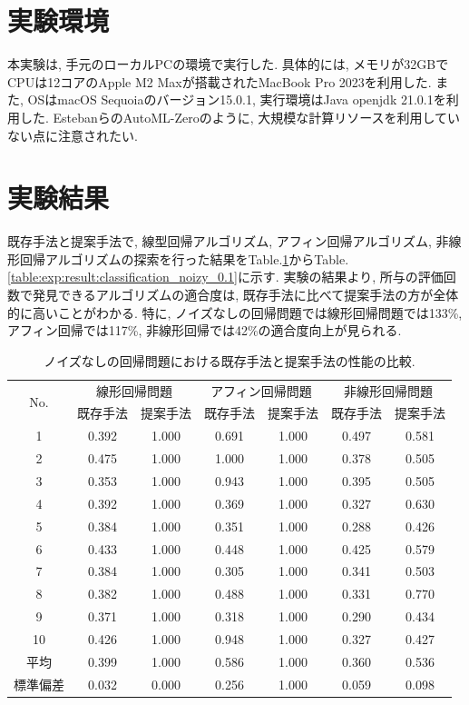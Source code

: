 \documentclass[11pt,oneside,openany,report]{jsbook}
\begin{document}
\section{実験環境}\label{sec:proposed:exp:environement}

本実験は, 手元のローカルPCの環境で実行した. 具体的には, メモリが32GBでCPUは12コアのApple M2 Maxが搭載されたMacBook Pro 2023を利用した. また, OSはmacOS Sequoiaのバージョン15.0.1, 実行環境はJava openjdk 21.0.1を利用した. EstebanらのAutoML-Zeroのように, 大規模な計算リソースを利用していない点に注意されたい.

\section{実験結果}\label{sec:proposed:exp:result}

既存手法と提案手法で, 線型回帰アルゴリズム, アフィン回帰アルゴリズム, 非線形回帰アルゴリズムの探索を行った結果をTable.\ref{table:exp:result:regression}からTable.\ref{table:exp:result:classification_noizy_0.1}に示す. 実験の結果より, 所与の評価回数で発見できるアルゴリズムの適合度は, 既存手法に比べて提案手法の方が全体的に高いことがわかる. 特に, ノイズなしの回帰問題では線形回帰問題では133\%, アフィン回帰では117\%, 非線形回帰では42\%の適合度向上が見られる.

\begin{table}[tbp]
  \caption{ノイズなしの回帰問題における既存手法と提案手法の性能の比較.}
  \label{table:exp:result:regression}
  \centering
  \begin{tabular}{|c|c|c|c|c|c|c|}
    \hline
    \multirow{2}{*}{No. } & \multicolumn{2}{c|}{線形回帰問題} & \multicolumn{2}{c|}{アフィン回帰問題} & \multicolumn{2}{c|}{非線形回帰問題} \\
    \cline{2-7}
    & 既存手法 & 提案手法 & 既存手法 & 提案手法 & 既存手法 & 提案手法 \\
    \hline \hline
    1       & 0.392  & 1.000 & 0.691 & 1.000 & 0.497 & 0.581 \\
    2       & 0.475  & 1.000 & 1.000 & 1.000 & 0.378 & 0.505 \\
    3       & 0.353  & 1.000 & 0.943 & 1.000 & 0.395 & 0.505 \\
    4       & 0.392  & 1.000 & 0.369 & 1.000 & 0.327 & 0.630 \\
    5       & 0.384  & 1.000 & 0.351 & 1.000 & 0.288 & 0.426 \\
    6       & 0.433  & 1.000 & 0.448 & 1.000 & 0.425 & 0.579 \\
    7       & 0.384  & 1.000 & 0.305 & 1.000 & 0.341 & 0.503 \\
    8       & 0.382  & 1.000 & 0.488 & 1.000 & 0.331 & 0.770 \\
    9       & 0.371  & 1.000 & 0.318 & 1.000 & 0.290 & 0.434 \\
    10      & 0.426  & 1.000 & 0.948 & 1.000 & 0.327 & 0.427 \\
    \hline
    平均    & 0.399 & 1.000 & 0.586 & 1.000 & 0.360 & 0.536  \\
    標準偏差 & 0.032 & 0.000 & 0.256 & 1.000 & 0.059 & 0.098 \\
    \hline
  \end{tabular}
\end{table}
\end{document}
